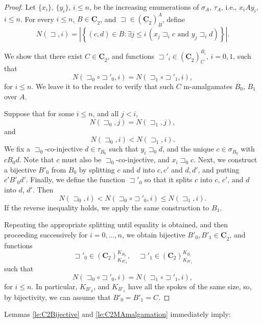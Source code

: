 \documentclass[12pt]{amsart}
\numberwithin{equation}{section}
\theoremstyle{plain}
\theoremstyle{definition}
\newcommand \sqsp{\sqsupset}
\newcommand \rt{\mathbf{0}}
\newcommand \CCb{\mathbf{C}}
\newcommand \CCub{\underline{\mathbf{C}}}
\begin{document}
\begin{proof}
 Let $\{x_i\}$, $\{y_i\}$, $i \leq n$, be the increasing enumerations of $\sigma_A$, $\tau_A$, i.e., $x_i A y_i$, $i \leq n$. For every $i\leq n$, $B \in \CCub_2$, and $\sqsp \in (\CCub_2)^A_B$,  define
 \[
 N(\sqsp,i)=
 \left|
 \left\{ (c,d)\in B: \exists j \leq i \, (x_j \sqsp_i c \text{ and }  y_j \sqsp_i d) \right\} \right|.
 \]

We show that there exist $C \in \CCub_2$, and functions $\sqsp'_i \in (\CCub_2)^{B_i}_{C}$, $i=0,1$, such that  
%
$$N(\sqsp_0 \circ \sqsp'_0,i)=N(\sqsp_1 \circ \sqsp'_1,i),$$
%
for $i \leq n$.  We leave it to the reader to verify that such $C$ m-amalgamates $B_0$, $B_1$ over $A$.  

Suppose that for some $i\leq n$, and all $j<i$, 
$$ N(\sqsp_0,j)=N(\sqsp_1,j), $$
and
$$ N(\sqsp_0,i)<N(\sqsp_1,i). $$
%
We fix a $\sqsp_0$-co-injective $d \in \tau_{B_0}$ such that $y_i\sqsp_0 d$, and the unique $c \in \sigma_{B_0} $ with $c B_0 d$. Note that $c$ must also be $\sqsp_0$-co-injective, and $x_i\sqsp_0 c$. Next, we construct a bijective $B'_0$ from $B_0$ by splitting $c$ and $d$ into $c, c'$ and $d, d'$, and putting $c' B'_0 d'$. Finally, we define the function $\sqsp'_0$ so that it splits $c$ into $c$, $c'$, and $d$ into $d$, $d'$.
Then
 $$  N(\sqsp_0,i)<N(\sqsp_0 \circ \sqsp'_0,i) \leq N(\sqsp_1,i).$$
 If the reverse inequality holds, we apply the same construction to
 $B_1$.
 
Repeating the appropriate splitting until equality is obtained, and then proceeding successively for $i=0,\ldots,n$, we obtain bijective $B'_0, B'_1 \in \CCub_2$, and functions $$\sqsp'_0 \in (\CCb_2)^{K_{B_0}}_{K_{B'_0}}, \quad \sqsp'_1 \in (\CCb_2)^{K_{B_1}}_{K_{B'_1}}$$ such that
 $$N(\sqsp_0 \circ \sqsp'_0,i)=N(\sqsp_1 \circ \sqsp'_1,i),$$
 for $i \leq n$. In particular, $K_{B'_0}$, and $K_{B'_1}$ have all the spokes of the same size, so, by bijectivity, we can assume that $B'_0=B'_1=C$.  
\end{proof}

Lemmas \ref{le:C2Bijective} and \ref{le:C2MAmalgamation} immediately imply:
\end{document}
